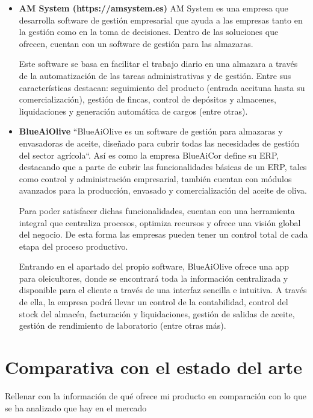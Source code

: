\begin{itemize}
    \item \textbf{AM System (https://amsystem.es)} 
    \newline
    AM System es una empresa que desarrolla software de gestión empresarial que ayuda a las empresas tanto en la 
    gestión como en la toma de decisiones. Dentro de las soluciones que ofrecen, cuentan con un software de gestión
    para las almazaras.

    Este software se basa en facilitar el trabajo diario en una almazara a través de la automatización de las tareas
    administrativas y de gestión. Entre sus características destacan: seguimiento del producto (entrada aceituna
    hasta su comercialización), gestión de fincas, control de depósitos y almacenes, liquidaciones y generación
    automática de cargos (entre otras).

    \item \textbf{BlueAiOlive}
    \newline 
    ``BlueAiOlive es un software de gestión para almazaras y envasadoras de aceite, diseñado para cubrir todas
    las necesidades de gestión del sector agrícola``. Así es como la empresa BlueAiCor define su ERP, destacando que a parte de cubrir
    las funcionalidades básicas de un ERP, tales como control y administración empresarial, también cuentan con módulos
    avanzados para la producción, envasado y comercialización del aceite de oliva.

    Para poder satisfacer dichas funcionalidades, cuentan con una herramienta integral que centraliza procesos, optimiza
    recursos y ofrece una visión global del negocio. De esta forma las empresas pueden tener un control total de cada etapa
    del proceso productivo.

    Entrando en el apartado del propio software, BlueAiOlive ofrece una app para oleicultores, donde se encontrará toda la
    información centralizada y disponible para el cliente a través de una interfaz sencilla e intuitiva. A través de ella,
    la empresa podrá llevar un control de la contabilidad, control del stock del almacén, facturación y liquidaciones, gestión
    de salidas de aceite, gestión de rendimiento de laboratorio (entre otras más).
\end{itemize}

\section{Comparativa con el estado del arte}

Rellenar con la información de qué ofrece mi producto en comparación con lo que se ha analizado que hay en el mercado

